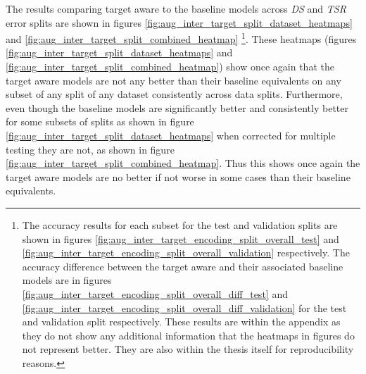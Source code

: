 The results comparing target aware to the baseline models across \textit{DS} and \textit{TSR} error splits are shown in figures \ref{fig:aug_inter_target_split_dataset_heatmaps} and \ref{fig:aug_inter_target_split_combined_heatmap} \footnote{The accuracy results for each subset for the test and validation splits are shown in figures \ref{fig:aug_inter_target_encoding_split_overall_test} and \ref{fig:aug_inter_target_encoding_split_overall_validation} respectively. The accuracy difference between the target aware and their associated baseline models are in figures \ref{fig:aug_inter_target_encoding_split_overall_diff_test} and \ref{fig:aug_inter_target_encoding_split_overall_diff_validation} for the test and validation split respectively. These results are within the appendix as they do not show any additional information that the heatmaps in figures do not represent better. They are also within the thesis itself for reproducibility reasons.}. These heatmaps (figures \ref{fig:aug_inter_target_split_dataset_heatmaps} and \ref{fig:aug_inter_target_split_combined_heatmap}) show once again that the target aware models are not any better than their baseline equivalents on any subset of any split of any dataset consistently across data splits. Furthermore, even though the baseline models are significantly better and consistently better for some subsets of splits as shown in figure \ref{fig:aug_inter_target_split_dataset_heatmaps} when corrected for multiple testing they are not, as shown in figure \ref{fig:aug_inter_target_split_combined_heatmap}. Thus this shows once again the target aware models are no better if not worse in some cases than their baseline equivalents.

